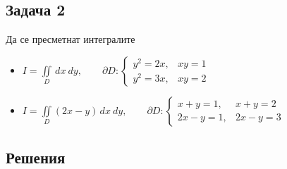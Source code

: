 \documentclass[a4paper,fleqn,12pt]{article}
\theoremstyle{definition}
\begin{document}
\subsection*{Задача 2}
Да се пресметнат интегралите 
\begin{itemize}
\item $I = \iint\limits_D \, dx \ dy, \qquad 
\partial D: \begin{cases} y^2 = 2x, & xy=1 \\ y^2 = 3x, & xy=2 \end{cases}$
\item $I = \iint\limits_D (2x - y)\, dx \ dy, \qquad 
\partial D: \begin{cases} x+y = 1, & x+y=2 \\ 2x-y = 1, & 2x-y = 3 \end{cases}$
\end{itemize}

\newpage
\subsection{Решения}
\end{document}
